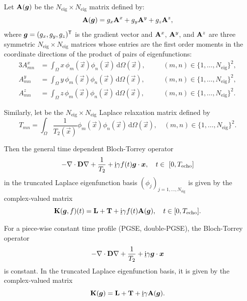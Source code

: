 \documentclass[a4paper]{article}
\begin{document}
Let $\mathbf{A}(\bm{g})$ be the $N_\text{eig} \times N_\text{eig}$ matrix defined by:
\begin{equation}
    \mathbf{A}(\bm{g}) = g_x \mathbf{A}^x + g_y \mathbf{A}^y + g_z \mathbf{A}^z,
\end{equation}
where $\bm{g} = (g_x, g_y, g_z)^{\mathsf{T}}$ is the gradient vector and $\mathbf{A}^x$, $\mathbf{A}^y$, and $\mathbf{A}^z$ are three symmetric $N_\text{eig} \times N_\text{eig}$ matrices whose entries are the first order moments in the coordinate directions of the product of pairs of eigenfunctions:
\begin{alignat}{3}
    A_{mn}^x & = \int_\Omega x \, \phi_m(\vec{x}) \phi_n(\vec{x}) \, \mathrm{d} \Omega(\vec{x}), \quad &  & (m, n) \in \{1, \dots, N_\text{eig}\}^2, \label{eq:lapeigfirstmm_x} \\
    A_{mn}^y & = \int_\Omega y \, \phi_m(\vec{x}) \phi_n(\vec{x}) \, \mathrm{d} \Omega(\vec{x}), \quad &  & (m, n) \in \{1, \dots, N_\text{eig}\}^2, \label{eq:lapeigfirstmm_y} \\
    A_{mn}^z & = \int_\Omega z \, \phi_m(\vec{x}) \phi_n(\vec{x}) \, \mathrm{d} \Omega(\vec{x}), \quad &  & (m, n) \in \{1, \dots, N_\text{eig}\}^2. \label{eq:lapeigfirstmm_z}
\end{alignat}

Similarly, let  be the $N_\text{eig} \times N_\text{eig}$ Laplace relaxation matrix defined by
\begin{equation}
    T_{mn} = \int_\Omega \frac{1}{T_2(\vec{x})} \phi_m(\vec{x}) \phi_n(\vec{x}) \, \mathrm{d} \Omega(\vec{x}), \quad (m,n) \in \{1, \dots, N_\text{eig}\}^2.
\end{equation}

Then the general time dependent Bloch-Torrey operator $$-\nabla \cdot \mat{D} \nabla + \frac{1}{T_2} + \imunit \gamma f(t) \vec{g} \cdot \vec{x}, \quad t \in [0, T_\text{echo}]$$ in the truncated Laplace eigenfunction basis $(\phi_j)_{j = 1, \dots, N_\text{eig}}$ is given by the complex-valued matrix
\begin{equation}
    \mathbf{K}(\bm{g}, f)(t) = \mathbf{L} + \mathbf{T} + \underline{\mathrm{i}} \gamma f(t) \mathbf{A}(\bm{g}),\quad t \in [0, T_\text{echo}].
\end{equation}

For a piece-wise constant time profile (PGSE, double-PGSE), the Bloch-Torrey operator $$-\nabla \cdot \mathbf{D} \nabla + \frac{1}{T_2} + \underline{\mathrm{i}} \gamma \bm{g} \cdot \bm{x}$$ is constant. In the truncated Laplace eigenfunction basis, it is given by the complex-valued matrix
\begin{equation}\label{eq:bt_matrix_constant}
    \mathbf{K}(\bm{g}) = \mathbf{L} + \mathbf{T} + \underline{\mathrm{i}} \gamma \mathbf{A}(\bm{g}).
\end{equation}
\end{document}
